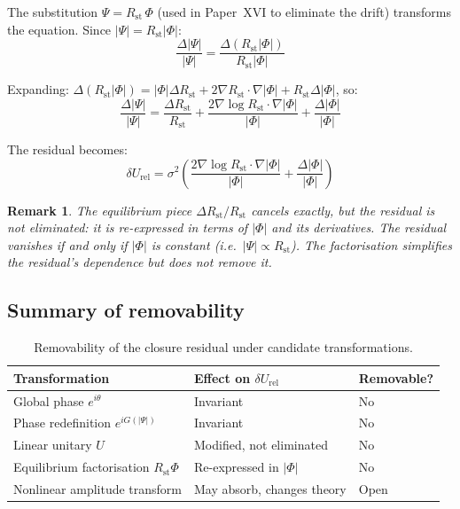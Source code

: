 \documentclass[12pt]{article}
\newtheorem{remark}[theorem]{Remark}
\newcommand{\Rst}{R_{\mathrm{st}}}
\newcommand{\dUrel}{\delta U_{\mathrm{rel}}}
\begin{document}
The substitution $\Psi = \Rst\,\Phi$ (used in Paper~XVI to eliminate the drift) transforms the equation. Since $|\Psi| = \Rst|\Phi|$:
\begin{equation}
    \frac{\Delta|\Psi|}{|\Psi|} = \frac{\Delta(\Rst|\Phi|)}{\Rst|\Phi|}
\end{equation}

Expanding: $\Delta(\Rst|\Phi|) = |\Phi|\Delta\Rst + 2\nabla\Rst\cdot\nabla|\Phi| + \Rst\Delta|\Phi|$, so:
\begin{equation}
    \frac{\Delta|\Psi|}{|\Psi|} = \frac{\Delta\Rst}{\Rst} + \frac{2\nabla\log\Rst\cdot\nabla|\Phi|}{|\Phi|} + \frac{\Delta|\Phi|}{|\Phi|}
\end{equation}

The residual becomes:
\begin{equation}\label{eq:residual_phi}
    \dUrel = \sigma^2\left(\frac{2\nabla\log\Rst\cdot\nabla|\Phi|}{|\Phi|} + \frac{\Delta|\Phi|}{|\Phi|}\right)
\end{equation}

\begin{remark}
The equilibrium piece $\Delta\Rst/\Rst$ cancels exactly, but the residual is not eliminated: it is re-expressed in terms of $|\Phi|$ and its derivatives. The residual vanishes if and only if $|\Phi|$ is constant (i.e.\ $|\Psi| \propto \Rst$). The factorisation simplifies the residual's dependence but does not remove it.
\end{remark}

\subsection{Summary of removability}

\begin{table}[ht]
\centering
\caption{Removability of the closure residual under candidate transformations.}
\label{tab:removability}
\begin{tabular}{@{}lll@{}}
\toprule
Transformation & Effect on $\dUrel$ & Removable? \\
\midrule
Global phase $e^{i\theta}$ & Invariant & No \\
Phase redefinition $e^{iG(|\Psi|)}$ & Invariant & No \\
Linear unitary $U$ & Modified, not eliminated & No \\
Equilibrium factorisation $\Rst\Phi$ & Re-expressed in $|\Phi|$ & No \\
Nonlinear amplitude transform & May absorb, changes theory & Open \\
\bottomrule
\end{tabular}
\end{table}
\end{document}

